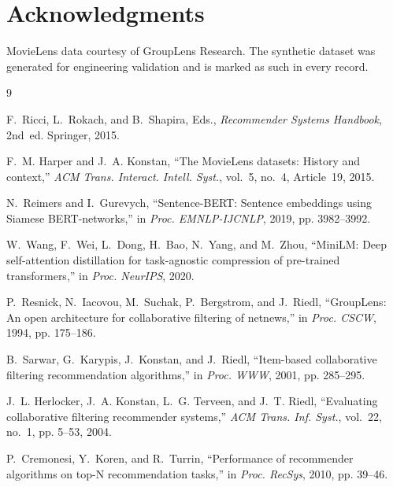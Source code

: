 \documentclass[conference]{IEEEtran}
\begin{document}
\section*{Acknowledgments}
MovieLens data courtesy of GroupLens Research. The synthetic dataset was
generated for engineering validation and is marked as such in every record.

\begin{thebibliography}{9}

F.~Ricci, L.~Rokach, and B.~Shapira, Eds., \emph{Recommender Systems Handbook},
2nd~ed. Springer, 2015.

F.~M. Harper and J.~A. Konstan, ``The MovieLens datasets: History and
context,'' \emph{ACM Trans. Interact. Intell. Syst.}, vol.~5, no.~4,
Article~19, 2015.

N.~Reimers and I.~Gurevych, ``Sentence-BERT: Sentence embeddings using Siamese
BERT-networks,'' in \emph{Proc. EMNLP-IJCNLP}, 2019, pp. 3982--3992.

W.~Wang, F.~Wei, L.~Dong, H.~Bao, N.~Yang, and M.~Zhou, ``MiniLM: Deep
self-attention distillation for task-agnostic compression of pre-trained
transformers,'' in \emph{Proc. NeurIPS}, 2020.

P.~Resnick, N.~Iacovou, M.~Suchak, P.~Bergstrom, and J.~Riedl, ``GroupLens: An
open architecture for collaborative filtering of netnews,'' in \emph{Proc.
CSCW}, 1994, pp. 175--186.

B.~Sarwar, G.~Karypis, J.~Konstan, and J.~Riedl, ``Item-based collaborative
filtering recommendation algorithms,'' in \emph{Proc. WWW}, 2001, pp.
285--295.

J.~L. Herlocker, J.~A. Konstan, L.~G. Terveen, and J.~T. Riedl, ``Evaluating
collaborative filtering recommender systems,'' \emph{ACM Trans. Inf. Syst.},
vol.~22, no.~1, pp. 5--53, 2004.

P.~Cremonesi, Y.~Koren, and R.~Turrin, ``Performance of recommender algorithms
on top-N recommendation tasks,'' in \emph{Proc. RecSys}, 2010, pp. 39--46.

\end{thebibliography}
\end{document}
